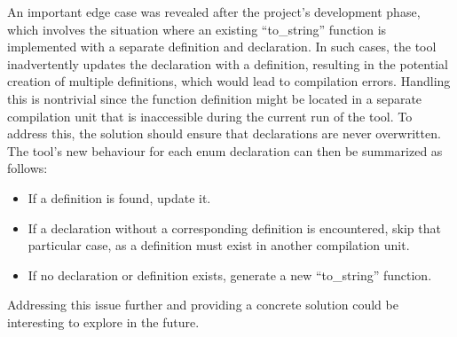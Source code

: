 An important edge case was revealed after the project's development phase, which involves the situation where an existing ``to\_string'' function is implemented with a separate definition and declaration.
In such cases, the tool inadvertently updates the declaration with a definition, resulting in the potential creation of multiple definitions, which would lead to compilation errors.
Handling this is nontrivial since the function definition might be located in a separate compilation unit that is inaccessible during the current run of the tool.
To address this, the solution should ensure that declarations are never overwritten.
The tool's new behaviour for each enum declaration can then be summarized as follows:
\vspace*{-0.75em}
\begin{itemize}
    \item If a definition is found, update it.
    \item If a declaration without a corresponding definition is encountered, skip that particular case, as a definition must exist in another compilation unit.
    \item If no declaration or definition exists, generate a new ``to\_string'' function.
\end{itemize}

Addressing this issue further and providing a concrete solution could be interesting to explore in the future.

